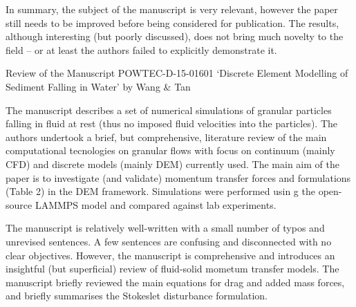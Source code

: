 \documentclass[14pt,twoside]{report}
\begin{document}
In summary, the subject of the manuscript is very relevant, however the paper still needs to be improved before being considered for publication. The results, although interesting (but poorly discussed), does not bring much novelty to the field -- or at least the authors failed to explicitly demonstrate it. 

\clearpage



\begin{center}
  {\Large Review of the Manuscript POWTEC-D-15-01601 `Discrete Element Modelling of Sediment Falling in Water' by Wang $\&$ Tan}
\end{center}

\medskip

The manuscript describes a set of numerical simulations of granular particles falling in fluid at rest (thus no imposed fluid velocities into the particles). The authors undertook a brief, but comprehensive, literature review of the main computational tecnologies on granular flows with focus on continuum (mainly CFD) and discrete models (mainly DEM) currently used. The main aim of the paper is to investigate (and validate) momentum transfer forces and formulations (Table 2) in the DEM framework. Simulations were performed usin g the open-source LAMMPS model and compared against lab experiments.

The manuscript is relatively well-written with a small number of typos and unrevised sentences. A few sentences are confusing and disconnected with no clear objectives. However, the manuscript is comprehensive and introduces an insightful (but superficial) review of fluid-solid mometum transfer models. The manuscript briefly reviewed the main equations for drag and added mass forces, and briefly summarises the Stokeslet disturbance formulation. 
\end{document}
